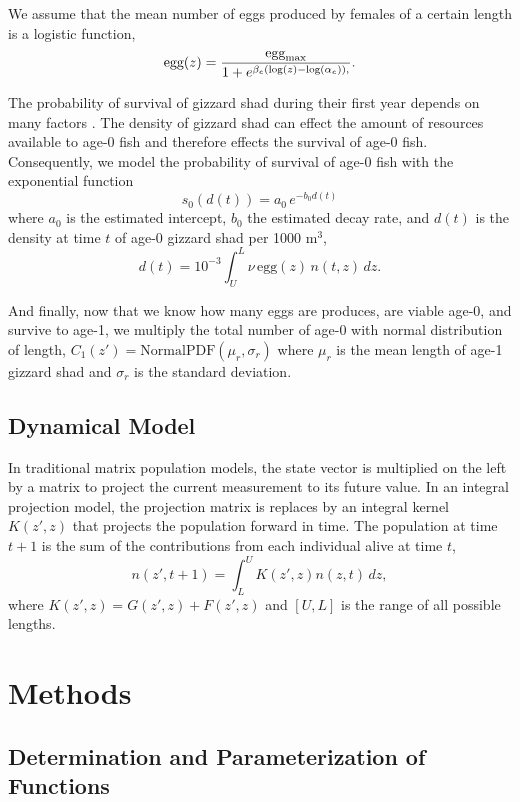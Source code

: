 \documentclass[11pt,oneside]{amsart}
\def\ds{\displaystyle}
\theoremstyle{definition}
\begin{document}
We assume that the mean number of eggs produced by females of a certain length is a logistic function,
\begin{equation}\label{eq:egg}
\mbox{egg}(z) = \frac{\mbox{egg}_{\rm max}}{1+e^{\beta_e(\log(z)-\log(\alpha_e)),}}.
\end{equation}

The probability of survival of gizzard shad during their first year depends on many factors \citep{michaletz2010overwinter}.  The density of gizzard shad can effect the amount of resources available to age-0 fish and therefore effects the survival of age-0 fish. Consequently, we model the probability of survival of age-0 fish with the exponential function
\begin{equation}\label{eq:s0}
s_0(d(t)) = a_0 \, e^{-b_0 d(t)}
\end{equation}
where $a_0$ is the estimated intercept, $b_0$ the estimated decay rate, and $d(t)$ is the density at time $t$ of age-0 gizzard shad per 1000 m$^3$, 
\[ d(t) = 10^{-3} \int_U^L \nu \, \mbox{egg}(z) \, n(t,z) \, dz. \]  

And finally, now that we know how many eggs are produces, are viable age-0, and survive to age-1, we multiply the total number of age-0 with normal distribution of length,
$ \ds C_1 (z') =  \mathrm{Normal PDF} (\mu_r, \sigma_r)$ where $\mu_r$ is the mean length of age-1 gizzard shad and $\sigma_r$ is the standard deviation. 

\subsection{Dynamical Model} 
In traditional matrix population models, the state vector is multiplied on the left by a matrix to project the current measurement to its future value.  In an integral projection model, the projection matrix is replaces by an integral kernel $K(z',z)$ that projects the population forward in time.  The population at time $t+1$ is the sum of the contributions from each individual alive at time $t$,
\begin{equation}\label{eq:IPM}
n(z',t+1) = \int_L^U K(z',z)n(z,t) \,dz,
\end{equation}  
where $K(z',z) = G(z',z) + F(z',z)$ and $[U,L]$ is the range of all possible lengths.

\section{Methods}
\subsection{Determination and Parameterization of Functions}
\end{document}
